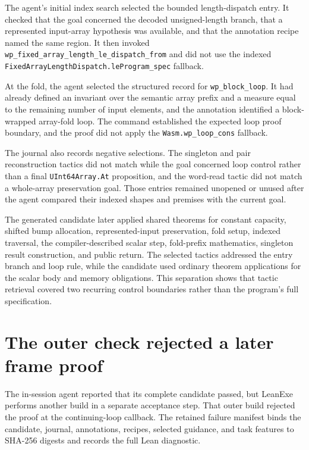\documentclass[10pt]{article}
\newcommand{\code}[1]{\texttt{#1}}
\begin{document}
The agent's initial index search selected the bounded length-dispatch entry.  It checked that the goal concerned the decoded unsigned-length branch, that a represented input-array hypothesis was available, and that the annotation recipe named the same region.  It then invoked \code{wp\_fixed\_array\_length\_le\_dispatch\_from} and did not use the indexed \code{FixedArrayLengthDispatch.leProgram\_spec} fallback.

At the fold, the agent selected the structured record for \code{wp\_block\_loop}.  It had already defined an invariant over the semantic array prefix and a measure equal to the remaining number of input elements, and the annotation identified a block-wrapped array-fold loop.  The command established the expected loop proof boundary, and the proof did not apply the \code{Wasm.wp\_loop\_cons} fallback.

The journal also records negative selections.  The singleton and pair reconstruction tactics did not match while the goal concerned loop control rather than a final \code{UInt64Array.At} proposition, and the word-read tactic did not match a whole-array preservation goal.  Those entries remained unopened or unused after the agent compared their indexed shapes and premises with the current goal.

The generated candidate later applied shared theorems for constant capacity, shifted bump allocation, represented-input preservation, fold setup, indexed traversal, the compiler-described scalar step, fold-prefix mathematics, singleton result construction, and public return.  The selected tactics addressed the entry branch and loop rule, while the candidate used ordinary theorem applications for the scalar body and memory obligations.  This separation shows that tactic retrieval covered two recurring control boundaries rather than the program's full specification.

\section{The outer check rejected a later frame proof}

The in-session agent reported that its complete candidate passed, but LeanExe performs another build in a separate acceptance step.  That outer build rejected the proof at the continuing-loop callback.  The retained failure manifest binds the candidate, journal, annotations, recipes, selected guidance, and task features to SHA-256 digests and records the full Lean diagnostic.
\end{document}
